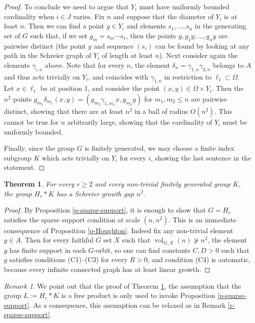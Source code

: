 \documentclass[11pt]{amsart}
\newcommand{\vol}{\ensuremath{\operatorname{vol}}}%
\theoremstyle{definition}
\theoremstyle{plain}
\newtheorem{thm}[defin]{Theorem}
\theoremstyle{remark}
\newtheorem{remark}[defin]{Remark}
\begin{document}
\begin{proof}
To conclude we need to argue that  $Y_i$ must have uniformly bounded cardinality when $i\in J$ varies. Fix $n$ and suppose that the diameter of $Y_i$ is at least $n$. Then we can find a point $y\in Y_i$ and elements $s_1, \ldots, s_n$ in the generating set of $G$ such that, if we set $g_m=s_m\cdots s_1$, then the points $y, g_1y,  \ldots, g_ny$ are pairwise distinct (the point $y$ and  sequence $(s_i)$ can be found by looking at any path in the Schreier graph of $Y_i$ of length at least $n$). Next consider again the elements $\gamma_{i, n}$ above. Note that for every $n$, the element $\delta_n=\gamma_{1, n} \gamma_{2, n}$ belongs to $A$ and thus acts trivially on $Y_i$, and coincides with $\gamma_{1, n}$ in restriction to $\ell_1\subset \Omega$. Let $x\in \ell_1$ be at position 1, and consider the point $(x, y)\in \Omega \times Y_i$. Then the $n^2$ points $g_{m_2} \delta_{m_1}(x, y)=(g_{m_2}\gamma_{1,m_1}x, g_{m_2}y)$ for $m_1, m_2\le n$ are pairwise distinct, showing that there are at least $n^2$ in a ball of radius $O(n^2)$. This cannot be true for $n$ arbitrarily large, showing that the cardinality of $Y_i$ must be uniformly bounded. 

Finally, since the group $G$ is finitely generated, we may choose a finite index subgroup $K$ which acts trivially on $Y_i$ for every $i$, showing the last sentence in the statement. \qedhere
\end{proof}


\begin{thm} \label{t-Houghton}
For every $r\ge 2$ and every non-trivial finitely generated group $K$, the group $H_r\ast K$ has a Schreier growth gap $n^2$. 
\end{thm}

\begin{proof}
By Proposition \ref{p-sparse-support}, it is enough to show that $G=H_r$ satisfies the sparse support condition at scale $(n, n^2)$. This is an immediate consequence of Proposition \ref{p-Houghton}. Indeed fix any non-trivial element $g\in A$. Then  for every faithful $G$ set $X$ such that $\vol_{G, X}(n) \not \succcurlyeq n^2$, the element $g$ has finite support in each $G$-orbit, so one can find constants $C, D>0$ such that $g$ satisfies conditions (C1)--(C3) for every $R>0$, and condition (C4) is automatic, because every infinite connected graph has at least linear growth. \qedhere
\end{proof}

\begin{remark}
We point out that the proof of Theorem  \ref{t-Houghton}, the assumption that the group $L:=H_r\ast K$ is a free product is only used to invoke  Proposition \ref{p-sparse-support}. As a consequence, this assumption can be relaxed as in Remark \ref{r-sparse-support}. 
 \end{remark}
 
\end{document}
